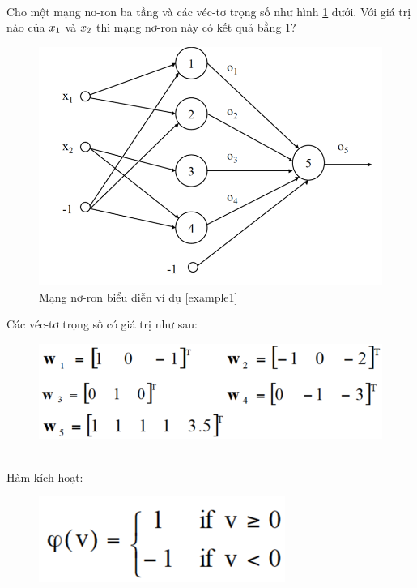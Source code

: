 \begin{exmp}
\label{example1}
\hrulefill\\
Cho một mạng nơ-ron ba tầng và các véc-tơ trọng số như hình \ref{fig:example1network} dưới. Với giá trị nào của $x\textsubscript{1}$ và $x\textsubscript{2}$ thì mạng nơ-ron này có kết quả bằng 1?

\begin{figure}[h!]
	\centering
		\includegraphics[width=0.7\columnwidth]{chapter01/figure/example 1.png}
		\centering
	\caption{Mạng nơ-ron biểu diễn ví dụ \ref{example1}}
	\label{fig:example1network}
\end{figure}


\noindent Các véc-tơ trọng số có giá trị như sau:

\begin{figure}[h]
\includegraphics[width=0.6\columnwidth]{chapter01/figure/example 1-weight.png}\
\end{figure}

\noindent Hàm kích hoạt:
\begin{figure}[!h]
\includegraphics[width=0.3\columnwidth]{chapter01/figure/example 1-activation.png}
\end{figure}

\end{exmp}

